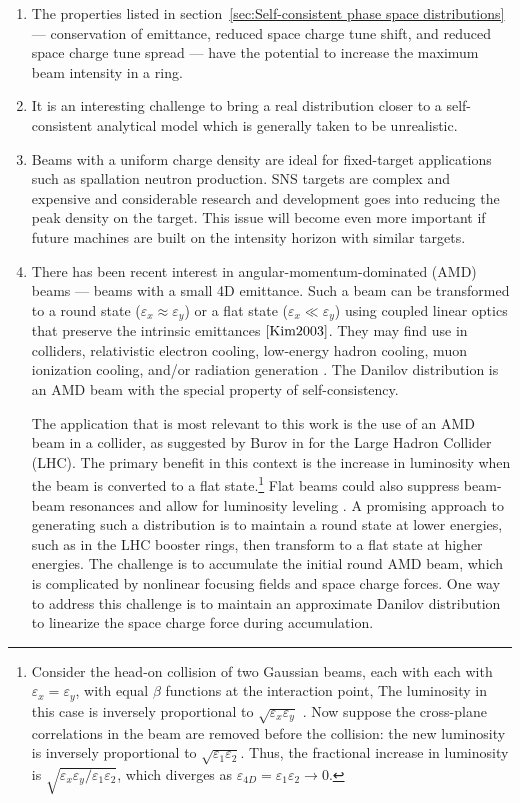 \begin{enumerate}
\item 
The properties listed in section~\ref{sec:Self-consistent phase space distributions} — conservation of emittance, reduced space charge tune shift, and reduced space charge tune spread — have the potential to increase the maximum beam intensity in a ring.

\item
It is an interesting challenge to bring a real distribution closer to a self-consistent analytical model which is generally taken to be unrealistic. 

\item
Beams with a uniform charge density are ideal for fixed-target applications such as spallation neutron production. SNS targets are complex and expensive \cite{Haines2014} and considerable research and development goes into reducing the peak density on the target. This issue will become even more important if future machines are built on the intensity horizon with similar targets.

\item
There has been recent interest in angular-momentum-dominated (AMD) beams — beams with a small 4D emittance. Such a beam can be transformed to a round state ($\varepsilon_x \approx \varepsilon_y$) or a flat state ($\varepsilon_x \ll \varepsilon_y$) using coupled linear optics that preserve the intrinsic emittances $\cite{Kim2003}$. They may find use in colliders, relativistic electron cooling, low-energy hadron cooling, muon ionization cooling, and/or radiation generation \cite{Burov2002}. The Danilov distribution is an AMD beam with the special property of self-consistency.

The application that is most relevant to this work is the use of an AMD beam in a collider, as suggested by Burov in \cite{Burov2013} for the Large Hadron Collider (LHC). The primary benefit in this context is the increase in luminosity when the beam is converted to a flat state.\footnote{Consider the head-on collision of two Gaussian beams, each with each with $\varepsilon_x = \varepsilon_y$, with equal $\beta$ functions at the interaction point, The luminosity in this case is inversely proportional to $\sqrt{\varepsilon_x \varepsilon_y}$ \cite{Herr2006}. Now suppose the cross-plane correlations in the beam are removed before the collision: the new luminosity is inversely proportional to $\sqrt{\varepsilon_1 \varepsilon_2}$. Thus, the fractional increase in luminosity is $\sqrt{{\varepsilon_x\varepsilon_y} / {\varepsilon_1\varepsilon_2}}$, which diverges as $\varepsilon_{4D} = \varepsilon_1\varepsilon_2 \rightarrow 0$.} Flat beams could also suppress beam-beam resonances and allow for luminosity leveling \cite{Burov2013}. A promising approach to generating such a distribution is to maintain a round state at lower energies, such as in the LHC booster rings, then transform to a flat state at higher energies. The challenge is to accumulate the initial round AMD beam, which is complicated by nonlinear focusing fields and space charge forces. One way to address this challenge is to maintain an approximate Danilov distribution to linearize the space charge force during accumulation.
\end{enumerate}

